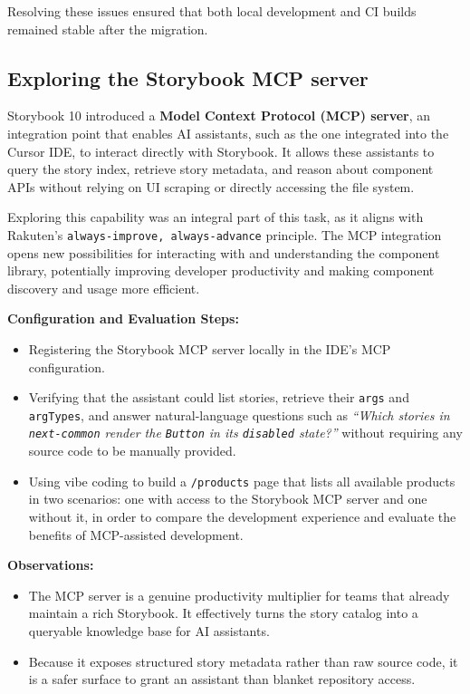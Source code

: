 Resolving these issues ensured that both local development and CI builds remained stable after the migration.

\subsection{Exploring the Storybook MCP server}

Storybook 10 introduced a \textbf{Model Context Protocol (MCP) server}, an integration point that enables AI assistants, such as the one integrated into the Cursor IDE, to interact directly with Storybook. It allows these assistants to query the story index, retrieve story metadata, and reason about component APIs without relying on UI scraping or directly accessing the file system.

Exploring this capability was an integral part of this task, as it aligns with Rakuten's \texttt{always-improve, always-advance} principle. The MCP integration opens new possibilities for interacting with and understanding the component library, potentially improving developer productivity and making component discovery and usage more efficient.

\textbf{Configuration and Evaluation Steps:}

\begin{itemize}

    \item Registering the Storybook MCP server locally in the IDE's MCP configuration.

    \item Verifying that the assistant could list stories, retrieve their \texttt{args} and \texttt{argTypes}, and answer natural-language questions such as \emph{``Which stories in \texttt{next-common} render the \texttt{Button} in its \texttt{disabled} state?''} without requiring any source code to be manually provided.

    \item Using vibe coding to build a \texttt{/products} page that lists all available products in two scenarios: one with access to the Storybook MCP server and one without it, in order to compare the development experience and evaluate the benefits of MCP-assisted development.

\end{itemize}

\textbf{Observations:}

\begin{itemize}
    \item The MCP server is a genuine productivity multiplier for teams that already maintain a rich Storybook. It effectively turns the story catalog into a queryable knowledge base for AI assistants.
    \item Because it exposes structured story metadata rather than raw source code, it is a safer surface to grant an assistant than blanket repository access.
\end{itemize}

